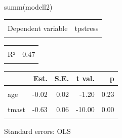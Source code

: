 \documentclass[
]{article}
\newenvironment{Shaded}{\begin{snugshade}}{\end{snugshade}}
\newcommand{\FunctionTok}[1]{\textcolor[rgb]{0.00,0.00,0.00}{#1}}
\newcommand{\NormalTok}[1]{#1}
\begin{document}
\begin{Shaded}
\begin{Highlighting}[]
\FunctionTok{summ}\NormalTok{(modell2)}
\end{Highlighting}
\end{Shaded}

\begin{table}[!h]
\centering
\begin{tabular}{lr}
\toprule
\cellcolor{gray!6}{Observations} & \cellcolor{gray!6}{423}\\
Dependent variable & tpstress\\
\cellcolor{gray!6}{Type} & \cellcolor{gray!6}{OLS linear regression}\\
\bottomrule
\end{tabular}
\end{table} \begin{table}[!h]
\centering
\begin{tabular}{lr}
\toprule
\cellcolor{gray!6}{F(4,418)} & \cellcolor{gray!6}{92.67}\\
R² & 0.47\\
\cellcolor{gray!6}{Adj. R²} & \cellcolor{gray!6}{0.46}\\
\bottomrule
\end{tabular}
\end{table} \begin{table}[!h]
\centering
\begin{threeparttable}
\begin{tabular}{lrrrr}
\toprule
  & Est. & S.E. & t val. & p\\
\midrule
\cellcolor{gray!6}{(Intercept)} & \cellcolor{gray!6}{51.72} & \cellcolor{gray!6}{1.37} & \cellcolor{gray!6}{37.71} & \cellcolor{gray!6}{0.00}\\
age & -0.02 & 0.02 & -1.20 & 0.23\\
\cellcolor{gray!6}{tmarlow} & \cellcolor{gray!6}{-0.15} & \cellcolor{gray!6}{0.11} & \cellcolor{gray!6}{-1.33} & \cellcolor{gray!6}{0.19}\\
tmast & -0.63 & 0.06 & -10.00 & 0.00\\
\cellcolor{gray!6}{tpcoiss} & \cellcolor{gray!6}{-0.16} & \cellcolor{gray!6}{0.02} & \cellcolor{gray!6}{-7.31} & \cellcolor{gray!6}{0.00}\\
\bottomrule
\end{tabular}
\begin{tablenotes}
\item Standard errors: OLS
\end{tablenotes}
\end{threeparttable}
\end{table}
\end{document}
